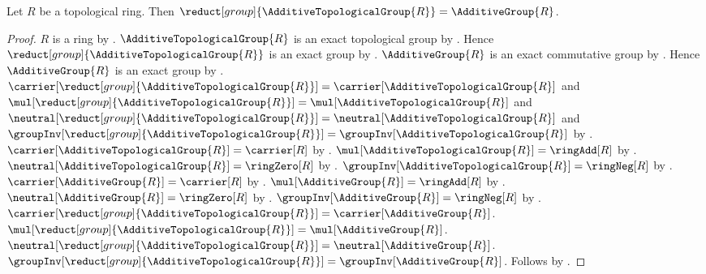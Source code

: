 \begin{theorem}\label{additive_topological_group_group_reduct}
    Let $R$ be a topological ring.
    Then
        $\reduct[group]{\AdditiveTopologicalGroup{R}}
            =\AdditiveGroup{R}$.
\end{theorem}
\begin{proof}
    $R$ is a ring by .
    $\AdditiveTopologicalGroup{R}$ is an exact topological group
        by .
    Hence $\reduct[group]{\AdditiveTopologicalGroup{R}}$ is an exact group
        by .
    $\AdditiveGroup{R}$ is an exact commutative group
        by .
    Hence $\AdditiveGroup{R}$ is an exact group
        by .
    $\carrier[\reduct[group]{\AdditiveTopologicalGroup{R}}]
        =\carrier[\AdditiveTopologicalGroup{R}]$ and
    $\mul[\reduct[group]{\AdditiveTopologicalGroup{R}}]
        =\mul[\AdditiveTopologicalGroup{R}]$ and
    $\neutral[\reduct[group]{\AdditiveTopologicalGroup{R}}]
        =\neutral[\AdditiveTopologicalGroup{R}]$ and
    $\groupInv[\reduct[group]{\AdditiveTopologicalGroup{R}}]
        =\groupInv[\AdditiveTopologicalGroup{R}]$ by
        .
    $\carrier[\AdditiveTopologicalGroup{R}]=\carrier[R]$
        by .
    $\mul[\AdditiveTopologicalGroup{R}]=\ringAdd[R]$
        by .
    $\neutral[\AdditiveTopologicalGroup{R}]=\ringZero[R]$
        by .
    $\groupInv[\AdditiveTopologicalGroup{R}]=\ringNeg[R]$
        by .
    $\carrier[\AdditiveGroup{R}]=\carrier[R]$
        by .
    $\mul[\AdditiveGroup{R}]=\ringAdd[R]$
        by .
    $\neutral[\AdditiveGroup{R}]=\ringZero[R]$
        by .
    $\groupInv[\AdditiveGroup{R}]=\ringNeg[R]$
        by .
    $\carrier[\reduct[group]{\AdditiveTopologicalGroup{R}}]
        =\carrier[\AdditiveGroup{R}]$.
    $\mul[\reduct[group]{\AdditiveTopologicalGroup{R}}]
        =\mul[\AdditiveGroup{R}]$.
    $\neutral[\reduct[group]{\AdditiveTopologicalGroup{R}}]
        =\neutral[\AdditiveGroup{R}]$.
    $\groupInv[\reduct[group]{\AdditiveTopologicalGroup{R}}]
        =\groupInv[\AdditiveGroup{R}]$.
    Follows by .
\end{proof}

